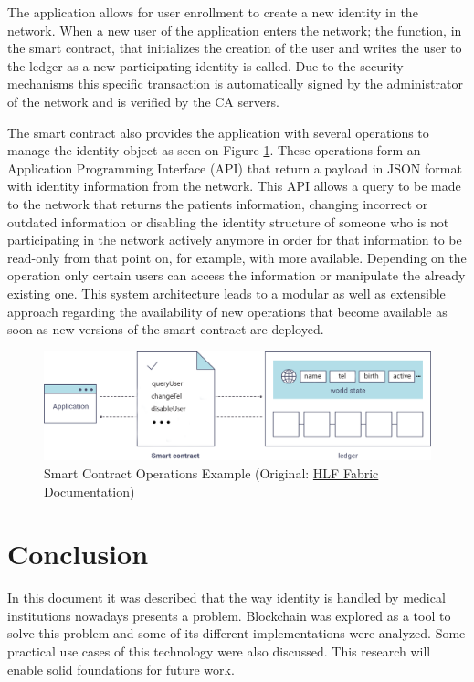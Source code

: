 \documentclass[]{llncs}
\begin{document}
The application allows for user enrollment to create a new identity in the network.
When a new user of the application enters the network; the function, in the smart contract, 
that initializes the creation of the user and writes the user to the ledger as a new participating 
identity is called. Due to the security mechanisms this specific transaction is automatically signed by the
administrator of the network and is verified by the CA servers.

The smart contract also provides the application with several operations to manage the identity object as seen 
on Figure \ref{fig:smartContractOverview}.
These operations form an Application Programming Interface (API) that return a payload in JSON format with 
identity information from the network. 
This API allows a query to be made to the network that returns the patients information, changing incorrect 
or outdated information or disabling the identity structure of someone who is not participating in the network 
actively anymore in order for that information to be read-only from that point on, for example, with more available. 
Depending on the operation only certain users can access the information or manipulate the already existing one.
This system architecture leads to a modular as well as extensible approach regarding the availability of new 
operations that become available as soon as new versions of the smart contract are deployed. 
\begin{figure}[ht]
\centering
\includegraphics[width=1\linewidth]{images/smartContractOverview.png}
\caption{\label{fig:smartContractOverview}Smart Contract Operations Example (Original: \href{http://hyperledger-fabric.readthedocs.io/en/latest/write_first_app.html}{HLF Fabric Documentation})}
\end{figure}
\newpage

\section{Conclusion} \label{conclusion}
In this document it was described that the way identity is handled by medical institutions nowadays 
presents a problem. Blockchain was explored as a tool to solve this problem and some of its different 
implementations were analyzed. Some practical use cases of this technology were also discussed. 
This research will enable solid foundations for future work.
\end{document}
